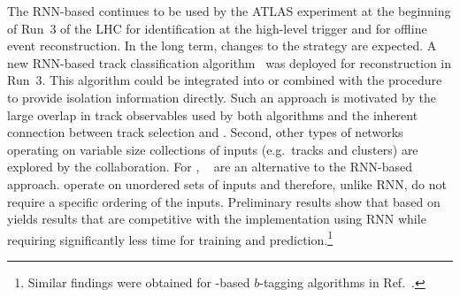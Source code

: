 The RNN-based \tauid continues to be used by the ATLAS experiment at
the beginning of Run~3 of the LHC for identification at the high-level
trigger and for offline event reconstruction. In the long term, changes to the \tauid
strategy are expected. A new RNN-based \tauhadvis track classification
algorithm~\cite{Maerker:2021hro} was deployed for \tauhadvis
reconstruction in Run~3. This algorithm could be
integrated into or combined with the \tauid procedure to provide
isolation information directly. Such an approach is motivated by the
large overlap in track observables used by both algorithms and the
inherent connection between \tauhadvis track selection and
\tauid. Second, other types of networks operating on variable size
collections of inputs (e.g.\ tracks and clusters) are explored by the
collaboration. For \tauid, \deepsets~\cite{NIPS2017_f22e4747} are an
alternative to the RNN-based approach. \deepsets operate on unordered
sets of inputs and therefore, unlike RNN, do not require a specific
ordering of the inputs. Preliminary results show that \tauid based on
\deepsets yields results that are competitive with the implementation
using RNN while requiring significantly less time for training and
prediction.\footnote{Similar findings were obtained for
  \deepsets-based $b$-tagging algorithms in
  Ref.~\cite{ATL-PHYS-PUB-2020-014}.}



